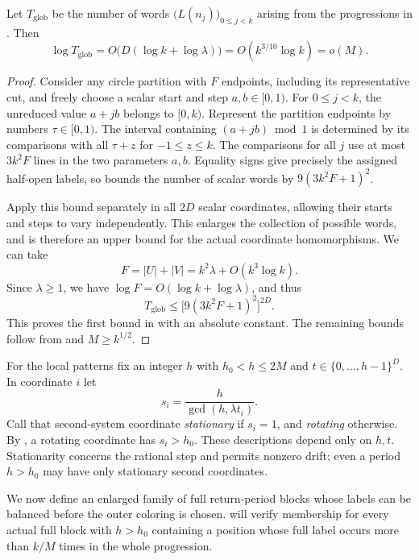 \begin{lemma}\label{count:global}
Let $T_{\mathrm{glob}}$ be the number of words
$\bigl(L(n_j)\bigr)_{0\le j<k}$ arising from the progressions in
. Then
\begin{equation}\label{count:global-bound}
 \log T_{\mathrm{glob}}
 =O\bigl(D(\log k+\log\lambda)\bigr)
 =O(k^{3/10}\log k)=o(M).
\end{equation}
\end{lemma}

\begin{proof}
Consider any circle partition with $F$ endpoints, including its
representative cut, and freely choose a scalar start and step
$a,b\in[0,1)$. For $0\le j<k$, the unreduced value $a+jb$ belongs
to $[0,k)$. Represent the partition endpoints by numbers
$\tau\in[0,1)$. The interval containing $(a+jb)\bmod1$ is determined
by its comparisons with all $\tau+z$ for $-1\le z\le k$.
The comparisons for all $j$ use at most $3k^2F$ lines in the
two parameters $a,b$. Equality signs give precisely the assigned
half-open labels, so  bounds the number of
scalar words by $9(3k^2F+1)^2$.

Apply this bound separately in all $2D$ scalar coordinates, allowing
their starts and steps to vary independently. This enlarges the
collection of possible words, and is therefore an upper bound for
the actual coordinate homomorphisms. We can take
\[
 F=|U|+|V|=k^2\lambda+O(k^3\log k).
\]
Since $\lambda\ge1$, we have
$\log F=O(\log k+\log\lambda)$, and thus
\[
 T_{\mathrm{glob}}\le\bigl[9(3k^2F+1)^2\bigr]^{2D}.
\]
This proves the first bound in  with an
absolute constant. The remaining bounds follow from
 and $M\ge k^{1/2}$.
\end{proof}

For the local patterns fix an integer $h$ with $h_0<h\le2M$ and
$t\in\{0,\ldots,h-1\}^D$. In coordinate $i$ let
\begin{equation}\label{count:coordinate-periods}
 s_i=\frac{h}{\gcd(h,\lambda t_i)}.
\end{equation}
Call that second-system coordinate \emph{stationary} if $s_i=1$, and
\emph{rotating} otherwise. By , a rotating
coordinate has $s_i>h_0$. These descriptions depend only on $h,t$.
Stationarity concerns the rational step and permits nonzero drift;
even a period $h>h_0$ may have only stationary second coordinates.

We now define an enlarged family of full return-period blocks whose
labels can be balanced before the outer coloring is chosen.
 will verify membership for every actual full
block with $h>h_0$ containing a position whose full label occurs more
than $k/M$ times in the whole progression.

